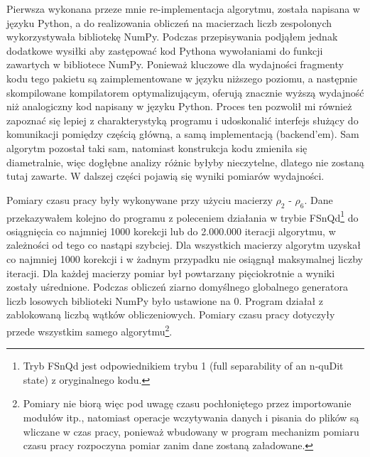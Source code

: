 \documentclass[11pt, a4paper]{article}
\begin{document}
\begin{sloppypar}
    Pierwsza wykonana przeze mnie re-implementacja algorytmu, została napisana w języku Python,
    a do realizowania obliczeń na macierzach liczb zespolonych wykorzystywała bibliotekę
    NumPy. Podczas przepisywania podjąłem jednak dodatkowe wysiłki aby zastępować kod Pythona
    wywołaniami do funkcji zawartych w bibliotece NumPy. Ponieważ kluczowe dla
    wydajności fragmenty kodu tego pakietu są zaimplementowane w języku niższego poziomu,
    a następnie skompilowane kompilatorem optymalizującym, oferują znacznie wyższą
    wydajność niż analogiczny kod napisany w języku Python. Proces ten pozwolił mi również
    zapoznać się lepiej z charakterystyką programu i udoskonalić interfejs służący do komunikacji
    pomiędzy częścią główną, a samą implementacją (backend'em). Sam algorytm pozostał taki
    sam, natomiast konstrukcja kodu zmieniła się diametralnie, więc dogłębne analizy różnic
    byłyby nieczytelne, dlatego nie zostaną tutaj zawarte. W dalszej części pojawią się wyniki
    pomiarów wydajności.

    Pomiary czasu pracy były wykonywane przy użyciu macierzy $\rho_{2}$ - $\rho_{6}$.
    Dane przekazywałem kolejno do programu z poleceniem działania w trybie FSnQd\footnote{Tryb
    FSnQd jest odpowiednikiem trybu 1 (full separability of an n-quDit state) z oryginalnego
    kodu.} do osiągnięcia co najmniej 1000 korekcji lub do 2.000.000 iteracji algorytmu,
    w zależności od tego co nastąpi szybciej. Dla wszystkich macierzy algorytm uzyskał
    co najmniej 1000 korekcji i w żadnym przypadku nie osiągnął maksymalnej liczby
    iteracji. Dla każdej macierzy pomiar był powtarzany pięciokrotnie a wyniki zostały uśrednione.
    Podczas obliczeń ziarno domyślnego globalnego generatora liczb losowych biblioteki
    NumPy było ustawione na 0. Program działał z zablokowaną liczbą wątków
    obliczeniowych. Pomiary czasu pracy dotyczyły przede wszystkim samego algorytmu\footnote{Pomiary
    nie biorą więc pod uwagę czasu pochłoniętego przez importowanie modułów itp.,
    natomiast operacje wczytywania danych i pisania do plików są wliczane w czas pracy, ponieważ
    wbudowany w program mechanizm pomiaru czasu pracy rozpoczyna pomiar zanim dane zostaną
    załadowane.}.


\end{sloppypar}
\end{document}
